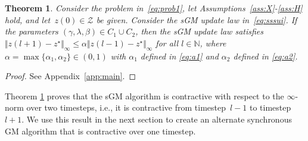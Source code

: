 \documentclass[9pt,shortpaper,twoside,web]{ieeecolor}
\newcommand{\R}{\ensuremath{\mathbb{R}}\xspace}
\newcommand{\X}{\ensuremath{\mathcal{X}}\xspace}
\newcommand{\Z}{\ensuremath{\mathcal{Z}}\xspace}
\newcommand{\V}{\ensuremath{\mathcal{V}}\xspace}
\newtheorem{theorem}{Theorem}
\begin{document}
\begin{theorem}\label{thrm:sssConv}
    Consider the problem in~\eqref{eq:prob1}, let Assumptions~\ref{ass:X}-\ref{ass:H} hold, and
    let~$z(0) \in \Z$ be given. 
    Consider the sGM update law in~\eqref{eq:sssui}. 
    If the parameters $(\gamma,\lambda,\beta)\in C_1\cup C_2$,
    then the sGM update law satisfies~$\Vert z(l+1)-z^\star\Vert_\infty\leq \alpha\Vert z(l-1)-z^\star\Vert_\infty$ for all $l\in\mathbb{N}$, where $\alpha=\max\{\alpha_1,\alpha_2\}\in(0,1)$ with $\alpha_1$ defined in \eqref{eq:a1} and $\alpha_2$ defined in \eqref{eq:a2}.
\end{theorem}
\begin{proof}
See Appendix~\ref{app:main}. 
\end{proof}

Theorem \ref{thrm:sssConv} proves that the sGM algorithm is contractive with respect to the $\infty$-norm over two timesteps, 
i.e., it is contractive from timestep~$l-1$ to timestep~$l+1$.
We use this result in the next section
to create an alternate synchronous GM algorithm that is contractive over one timestep.
\end{document}
